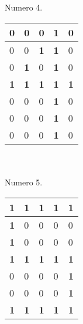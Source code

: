 \documentclass[40pt]{article}
\begin{document}
\maketitle
\textsf{\\
\\
Numero 4.\\}

\vspace{0.0 cm}
\begin{table}[h!]
\begin{tabular}{|p{.3 cm}|p{.3 cm}|p{.3 cm}|p{.3 cm}|p{.3 cm}| }
\hline
0&0&0&\textbf{1}&0
\\\hline
0&0&\textbf{1}&\textbf{1}&0
\\\hline
0&\textbf{1}&0&\textbf{1}&0
\\\hline
\textbf{1}&\textbf{1}&\textbf{1}&\textbf{1}&\textbf{1}
\\\hline
0&0&0&\textbf{1}&0
\\\hline
0&0&0&\textbf{1}&0
\\\hline
0&0&0&\textbf{1}&0
\\\hline
\end{tabular}
\end{table}


\maketitle
\textsf{\\
\\
Numero 5.\\}

\vspace{0.0 cm}
\begin{table}[h!]
\begin{tabular}{|p{.3 cm}|p{.3 cm}|p{.3 cm}|p{.3 cm}|p{.3 cm}| }
\hline
\textbf{1}&\textbf{1}&\textbf{1}&\textbf{1}&\textbf{1}
\\\hline
\textbf{1}&0&0&0&0
\\\hline
\textbf{1}&0&0&0&0
\\\hline
\textbf{1}&\textbf{1}&\textbf{1}&\textbf{1}&\textbf{1}
\\\hline
0&0&0&0&\textbf{1}
\\\hline
0&0&0&0&\textbf{1}
\\\hline
\textbf{1}&\textbf{1}&\textbf{1}&\textbf{1}&\textbf{1}
\\\hline
\end{tabular}
\end{table}
\end{document}
